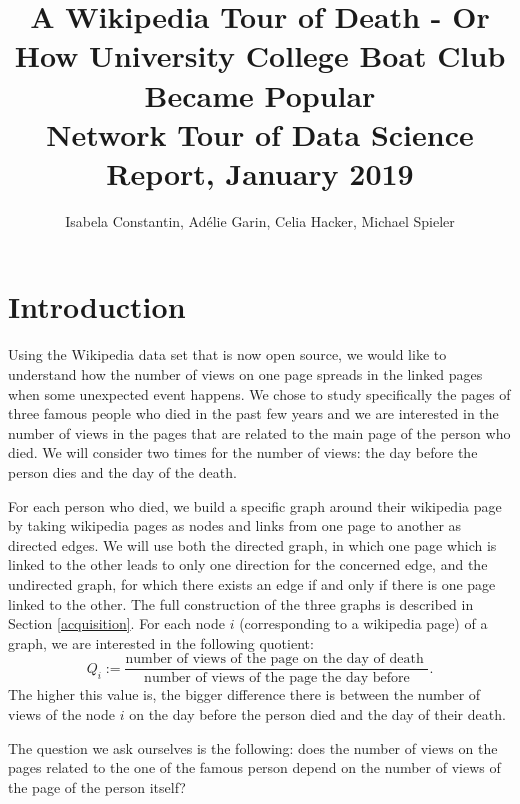 \documentclass[conference]{IEEEtran}
\begin{document}
\title{A Wikipedia Tour of Death - Or How University College Boat Club Became Popular\\
{\footnotesize Network Tour of Data Science Report, January 2019}
}

\author{Isabela Constantin, Ad\'elie Garin, Celia Hacker, Michael Spieler}

\maketitle

\section{Introduction}
Using the Wikipedia data set that is now open source, we would like to understand how the number of views on one page spreads in the linked pages when some unexpected event happens. We chose to study specifically the pages of three famous people who died in the past few years and we are interested in the number of views in the pages that are related to the main page of the person who died. We will consider two times for the number of views: the day before the person dies and the day of the death. 

\medskip

For each person who died, we build a specific graph around their wikipedia page by taking wikipedia pages as nodes and links from one page to another as directed edges. We will use both the directed graph, in which one page which is linked to the other leads to only one direction for the concerned edge, and the undirected graph, for which there exists an edge if and only if there is one page linked to the other. The full construction of the three graphs is described in Section \ref{acquisition}. For each node $i$ (corresponding to a wikipedia page) of a graph, we are interested in the following quotient: \[Q_i:=\frac{\text{number of views of the page on the day of death }}{\text{number of views of the page the day before}}.\] The higher this value is, the bigger difference there is between the number of views of the node $i$ on the day before the person died and the day of their death. 

\medskip

The question we ask ourselves is the following: does the number of views on the pages related to the one of the famous person depend on the number of views of the page of the person itself? 

\medskip
\end{document}
